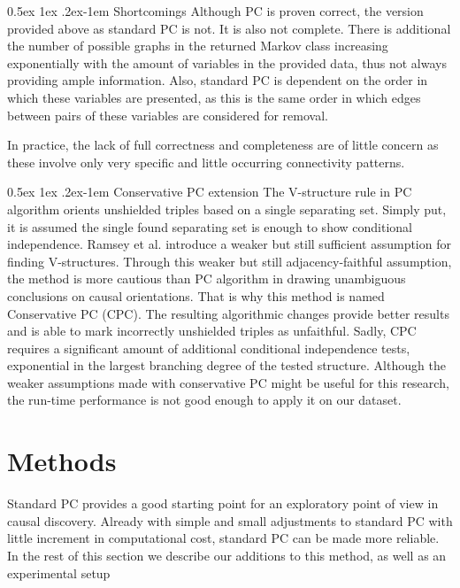 \documentclass[a4paper, 10pt, english, onecolumn]{article}
\makeatletter
\renewcommand{\paragraph}{%
  \@startsection{paragraph}{4}%
  {\z@}{0.5ex \@plus 1ex \@minus .2ex}{-1em}%
  {\normalfont\normalsize\bfseries}%
}
\makeatother
\begin{document}
\paragraph{Shortcomings}
Although PC is proven correct, the version provided above as standard PC is not.
It is also not complete.
There is additional the number of possible graphs in the returned Markov class increasing exponentially with the amount of variables in the provided data, thus not always providing ample information.
Also, standard PC is dependent on the order in which these variables are presented, as this is the same order in which edges between pairs of these variables are considered for removal\cite[p.88]{spirtes2000}.

In practice, the lack of full correctness and completeness are of little concern as these involve only very specific and little occurring connectivity patterns\cite[p.127-130]{spirtes2000}.

\paragraph{Conservative PC extension}
The V-structure rule in PC algorithm orients unshielded triples based on a single separating set. 
Simply put, it is assumed the single found separating set is enough to show conditional independence. 
Ramsey et al. \cite{ramsey2012} introduce a weaker but still sufficient assumption for finding V-structures.
Through this weaker but still adjacency-faithful assumption, the method is more cautious than PC algorithm in drawing unambiguous conclusions on causal orientations.
That is why this method is named Conservative PC (CPC).
The resulting algorithmic changes provide better results and is able to mark incorrectly unshielded triples as unfaithful.
Sadly, CPC requires a significant amount of additional conditional independence tests, exponential in the largest branching degree of the tested structure.
Although the weaker assumptions made with conservative PC might be useful for this research, the run-time performance is not good enough to apply it on our dataset.

\section{Methods}%
Standard PC provides a good starting point for an exploratory point of view in causal discovery.
Already with simple and small adjustments to standard PC with little increment in computational cost, standard PC can be made more reliable.
In the rest of this section we describe our additions to this method, as well as an experimental setup
\end{document}
